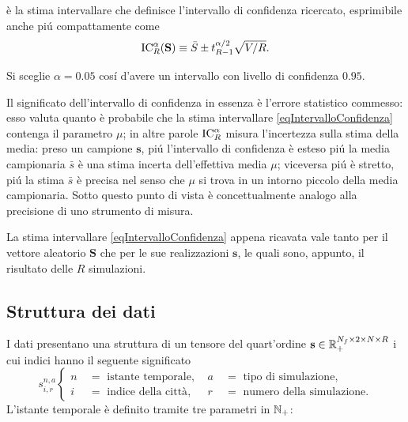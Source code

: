             è la stima intervallare che definisce l'intervallo di confidenza ricercato, esprimibile anche piú compattamente come
            \begin{equation}
                \label{eqIntervalloConfidenza}
                \operatorname{IC}^\alpha_R(\mathbf S)\equiv\bar S\pm t_{R-1}^{\alpha/2}\sqrt{V/R}.
            \end{equation}
            \begin{ipo}
                Si sceglie \(\alpha=0.05\) cosí d'avere un intervallo con livello di confidenza \(0.95\).   
            \end{ipo}
            Il significato dell'intervallo di confidenza in essenza è l'errore statistico commesso: esso valuta quanto è probabile che la stima intervallare \cref{eqIntervalloConfidenza} contenga il parametro \(\mu\); in altre parole \(\operatorname{IC}^\alpha_R\) misura l'incertezza sulla stima della media: preso un campione \(\mathbf s\), piú l'intervallo di confidenza è esteso piú la media campionaria \(\bar s\) è una stima incerta dell'effettiva media \(\mu\); viceversa piú è stretto, piú la stima \(\bar s\) è precisa nel senso che \(\mu\) si trova in un intorno piccolo della media campionaria. Sotto questo punto di vista è concettualmente analogo alla precisione di uno strumento di misura.
            \begin{oss}
                La stima intervallare \cref{eqIntervalloConfidenza} appena ricavata vale tanto per il vettore aleatorio \(\mathbf S\) che per le sue realizzazioni \(\mathbf s\), le quali sono, appunto, il risultato delle \(R\) simulazioni.
            \end{oss}

        \subsection{Struttura dei dati}

            I dati presentano una struttura di un tensore del quart'ordine \(\mathbf s\in\mathbb R_+^{N_f\times2\times N\times R}\) i cui indici hanno il seguente significato
            \begin{equation*}
                s^{n,a}_{i,r}
                \left\{\begin{aligned}
                    n\ &=\text{ istante temporale},&\ 
                    a\ &=\text{ tipo di simulazione},\\
                    i\ &=\text{ indice della città},&\ 
                    r\ &=\text{ numero della simulazione}.
                \end{aligned}\right.
            \end{equation*}
            L'istante temporale è definito tramite tre parametri in \(\mathbb N_+\):

